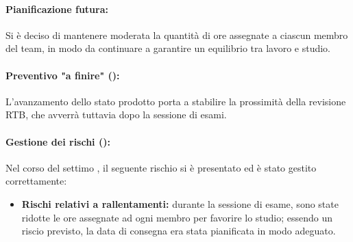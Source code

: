 \paragraph*{Pianificazione futura:}
\par Si è deciso di mantenere moderata la quantità di ore assegnate a ciascun membro del team, in modo da continuare a garantire un equilibrio tra lavoro e studio.

\paragraph*{Preventivo "a finire" ():}
\par L'avanzamento dello stato prodotto porta a stabilire la prossimità della revisione RTB, che avverrà tuttavia dopo la sessione di esami.

\paragraph*{Gestione dei rischi ():}
\par Nel corso del settimo , il seguente rischio si è presentato ed è stato gestito correttamente:
\begin{itemize}
  \item \textbf{Rischi relativi a rallentamenti:} durante la sessione di esame, sono state ridotte le ore assegnate ad ogni membro per favorire lo studio; essendo un riscio previsto, la data di consegna era stata pianificata in modo adeguato.
\end{itemize}
